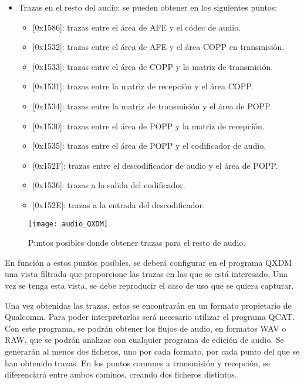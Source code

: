 \begin{itemize}
	\item{Trazas en el resto del audio: se pueden obtener en los siguientes puntos:}
	\begin{itemize}
		\item{[0x1586]: trazas entre el área de \gls{AFE} y el códec de audio.}
		\item{[0x1532]: trazas entre el área de \gls{AFE} y el área \gls{COPP} en transmisión.}
		\item{[0x1533]: trazas entre el área de \gls{COPP} y la matriz de transmisión.}
		\item{[0x1531]: trazas entre la matriz de recepción y el área \gls{COPP}.}
		\item{[0x1534]: trazas entre la matriz de transmisión y el área de \gls{POPP}.}
		\item{[0x1530]: trazas entre el área de \gls{POPP} y la matriz de recepción.}
		\item{[0x1535]: trazas entre el área de \gls{POPP} y el codificador de audio.}
		\item{[0x152F]: trazas entre el descodificador de audio y el área de \gls{POPP}.}
		\item{[0x1536]: trazas a la salida del codificador.}
		\item{[0x152E]: trazas a la entrada del descodificador.}
	\end{itemize}
\end{itemize}

\begin{figure}[H]
	\centering
	\texttt{[image: audio\_QXDM]}
	\caption{Puntos posibles donde obtener trazas para el resto de audio.} 
	\label{fig:audio_qxdm}
\end{figure}

En función a estos puntos posibles, se deberá configurar en el programa \gls{QXDM} una vista filtrada que proporcione las trazas en las que se está interesado. Una vez se tenga esta vista, se debe reproducir el caso de uso que se quiera capturar.

Una vez obtenidas las trazas, estas se encontrarán en un formato propietario de Qualcomm. Para poder interpretarlas será necesario utilizar el programa \gls{QCAT}. Con este programa, se podrán obtener los flujos de audio, en formatos WAV o RAW, que se podrán analizar con cualquier programa de edición de audio. Se generarán al menos dos ficheros, uno por cada formato, por cada punto del que se han obtenido trazas. En los puntos comunes a transmisión y recepción, se diferenciará entre ambos caminos, creando dos ficheros distintos.

